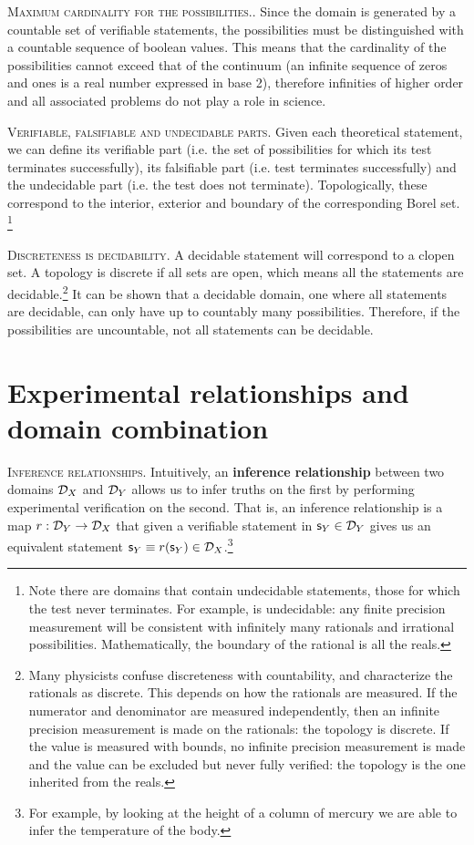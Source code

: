 \documentclass[10pt,twocolumn, nofootinbib]{revtex4-1}
\newcommand\partitle[1]{\textsc{#1}.}
\begin{document}
\partitle{Maximum cardinality for the possibilities.} Since the domain is generated by a countable set of verifiable statements, the possibilities must be distinguished with a countable sequence of boolean values. This means that the cardinality of the possibilities cannot exceed that of the continuum (an infinite sequence of zeros and ones is a real number expressed in base 2), therefore infinities of higher order and all associated problems do not play a role in science.

\partitle{Verifiable, falsifiable and undecidable parts} Given each theoretical statement, we can define its verifiable part (i.e. the set of possibilities for which its test terminates successfully), its falsifiable part (i.e. test terminates successfully) and the undecidable part (i.e. the test does not terminate). Topologically, these correspond to the interior, exterior and boundary of the corresponding Borel set. \footnote{Note there are domains that contain undecidable statements, those for which the test never terminates. For example,  is undecidable: any finite precision measurement will be consistent with infinitely many rationals and irrational possibilities. Mathematically, the boundary of the rational is all the reals.}

\partitle{Discreteness is decidability} A decidable statement will correspond to a clopen set. A topology is discrete if all sets are open, which means all the statements are decidable.\footnote{Many physicists confuse discreteness with countability, and characterize the rationals as discrete. This depends on how the rationals are measured. If the numerator and denominator are measured independently, then an infinite precision measurement is made on the rationals: the topology is discrete. If the value is measured with bounds, no infinite precision measurement is made and the value can be excluded but never fully verified: the topology is the one inherited from the reals.} It can be shown that a decidable domain, one where all statements are decidable, can only have up to countably many possibilities. Therefore, if the possibilities are uncountable, not all statements can be decidable.

\section{Experimental relationships and domain combination}

\partitle{Inference relationships} Intuitively, an \textbf{ inference relationship} between two domains $\mathcal{D}_X$ and $\mathcal{D}_Y$ allows us to infer truths on the first by performing experimental verification on the second. That is, an inference relationship is a map $r : \mathcal{D}_Y \to \mathcal{D}_X$ that given a verifiable statement in $\mathsf{s}_Y \in \mathcal{D}_Y$ gives us an equivalent statement $\mathsf{s}_Y \equiv r(\mathsf{s}_Y) \in \mathcal{D}_X$.\footnote{For example, by looking at the height of a column of mercury we are able to infer the temperature of the body.}
\end{document}

